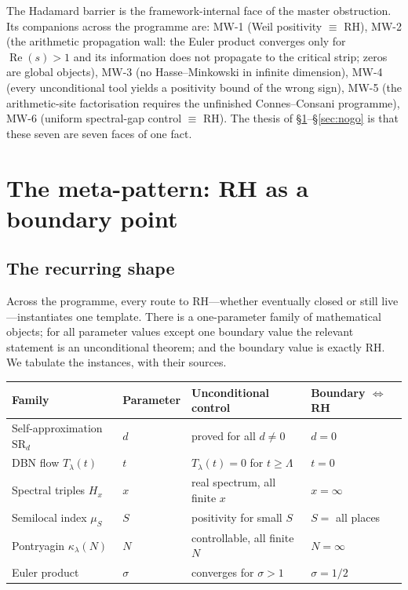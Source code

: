 \documentclass[11pt]{amsart}
\theoremstyle{definition}
\theoremstyle{remark}
\newcommand{\Tl}{T_\lambda}
\DeclareMathOperator{\Real}{Re}
\begin{document}
The Hadamard barrier is the framework-internal face of the master
obstruction. Its companions across the programme are: MW-1 (Weil
positivity $\equiv$ RH), MW-2 (the arithmetic propagation wall: the Euler
product converges only for $\Real(s)>1$ and its information does not
propagate to the critical strip; zeros are global objects), MW-3 (no
Hasse--Minkowski in infinite dimension), MW-4 (every unconditional tool
yields a positivity bound of the wrong sign), MW-5 (the arithmetic-site
factorisation requires the unfinished Connes--Consani programme), MW-6
(uniform spectral-gap control $\equiv$ RH). The thesis of
\S\ref{sec:metapattern}--\S\ref{sec:nogo} is that these seven are seven
faces of one fact.

\section{The meta-pattern: RH as a boundary point}\label{sec:metapattern}

\subsection{The recurring shape}
Across the programme, every route to RH---whether eventually closed or
still live---instantiates one template. There is a one-parameter family of
mathematical objects; for all parameter values except one boundary value
the relevant statement is an unconditional theorem; and the boundary value
is exactly RH. We tabulate the instances, with their sources.

\begin{center}
\renewcommand{\arraystretch}{1.3}
\begin{tabular}{llll}
\textbf{Family} & \textbf{Parameter} & \textbf{Unconditional control} & \textbf{Boundary $\iff$ RH}\\
\hline
Self-approximation $\mathrm{SR}_d$ & $d$ & proved for all $d\neq0$ & $d=0$\\
DBN flow $\Tl(t)$ & $t$ & $\Tl(t)=0$ for $t\geq\Lambda$ & $t=0$\\
Spectral triples $H_x$ & $x$ & real spectrum, all finite $x$ & $x=\infty$\\
Semilocal index $\mu_S$ & $S$ & positivity for small $S$ & $S=$ all places\\
Pontryagin $\kappa_\lambda(N)$ & $N$ & controllable, all finite $N$ & $N=\infty$\\
Euler product & $\sigma$ & converges for $\sigma>1$ & $\sigma=1/2$\\
\end{tabular}
\end{center}
\end{document}
